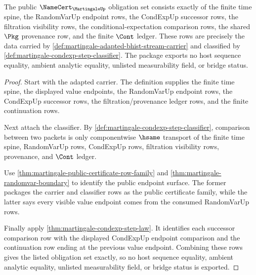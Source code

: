 \begin{theorem}
\label{thm:martingale-obligation-closure-package}
The public $\NameCert_{\MartingaleUp}$ obligation set consists exactly of the
finite time spine, the RandomVarUp endpoint rows, the CondExpUp successor
rows, the filtration visibility rows, the conditional-expectation comparison
rows, the shared $\Pkg$ provenance row, and the finite $\Cont$ ledger. These
rows are precisely the data carried by
\autoref{def:martingale-adapted-bhist-stream-carrier} and classified by
\autoref{def:martingale-condexp-step-classifier}. The package exports no host
sequence equality, ambient analytic equality, unlisted measurability field, or
bridge status.
\end{theorem}
\begin{proof}
Start with the adapted carrier. The definition supplies the finite time spine,
the displayed value endpoints, the RandomVarUp endpoint rows, the CondExpUp
successor rows, the filtration/provenance ledger rows, and the finite
continuation rows.

Next attach the classifier. By
\autoref{def:martingale-condexp-step-classifier}, comparison between two
packets is only componentwise $\hsame$ transport of the finite time spine,
RandomVarUp rows, CondExpUp rows, filtration visibility rows, provenance, and
$\Cont$ ledger.

Use \autoref{thm:martingale-public-certificate-row-family} and
\autoref{thm:martingale-randomvar-boundary} to identify the public endpoint
surface. The former packages the carrier and classifier rows as the public
certificate family, while the latter says every visible value endpoint comes
from the consumed RandomVarUp rows.

Finally apply \autoref{thm:martingale-condexp-step-law}. It identifies each
successor comparison row with the displayed CondExpUp endpoint comparison and
the continuation row ending at the previous value endpoint. Combining these
rows gives the listed obligation set exactly, so no host sequence equality,
ambient analytic equality, unlisted measurability field, or bridge status is
exported.
\end{proof}

